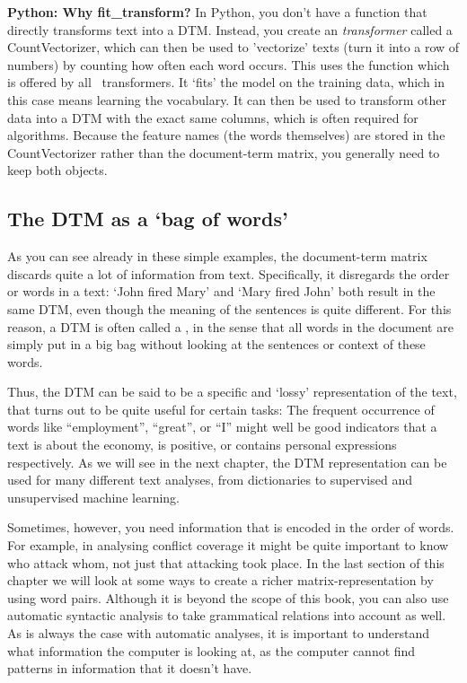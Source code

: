 \begin{feature}
\noindent\textbf{Python: Why fit\_transform?}
In Python, you don't have a function that directly transforms text into a DTM.
Instead, you create an \emph{transformer} called a CountVectorizer,
which can then be used to 'vectorize' texts (turn it into a row of numbers)
by counting how often each word occurs.
This uses the  function which is offered by all \sklearn\ transformers.
It `fits' the model on the training data, which in this case means learning the vocabulary.
It can then be used to transform other data into a DTM with the exact same columns,
which is often required for algorithms.
Because the feature names (the words themselves) are stored in the CountVectorizer
rather than the document-term matrix, you generally need to keep both objects.
\end{feature}

\subsection{The DTM as a `bag of words'}


As you can see already in these simple examples, the document-term matrix discards quite a lot of information from text.
Specifically, it disregards the order or words in a text: `John fired Mary' and `Mary fired John' both result in the same DTM,
even though the meaning of the sentences is quite different.
For this reason, a DTM is often called a , in the sense that all words in the document are simply put in a big bag
without looking at the sentences or context of these words. 

Thus, the DTM can be said to be a specific and `lossy' representation of the text, that turns out to be quite useful for certain tasks:
The frequent occurrence of words like ``employment'', ``great'', or ``I'' might well be good indicators that a text is about the economy,
is positive, or contains personal expressions respectively.
As we will see in the next chapter, the DTM representation can be used for many different text analyses, from dictionaries to supervised and unsupervised machine learning.

Sometimes, however, you need information that is encoded in the order of words.
For example, in analysing conflict coverage it might be quite important to know who attack whom, not just that attacking took place.
In the last section of this chapter we will look at some ways to create a richer matrix-representation by using word pairs.
Although it is beyond the scope of this book,
you can also use automatic syntactic analysis to take grammatical relations into account as well.
As is always the case with automatic analyses, it is important to understand what information the computer is looking at,
as the computer cannot find patterns in information that it doesn't have.

